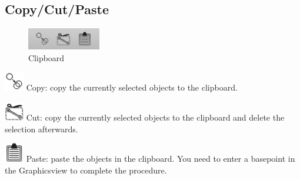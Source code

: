 \documentclass[a4paper,11pt]{report}
\begin{document}
\subsection{Copy/Cut/Paste}
\begin{minipage}[h]{4cm}
\begin{figure}[H]
\begin{center}
\includegraphics[scale=0.6]{../pictures/clipboardtoolbar.png}
\caption{Clipboard}
\label{pic:clipboardtoolbar}
\end{center}
\end{figure}
\end{minipage}
\begin{minipage}[h]{\textwidth-4cm}
\begin{trivlist}
	\item[] \includegraphics[scale = 0.5]{../../icons/copy.png} Copy: copy the currently selected objects to the clipboard.
	\item[] \includegraphics[scale = 0.5]{../../icons/cut.png} Cut: copy the currently selected objects to the clipboard and delete the selection afterwards.
	\item[] \includegraphics[scale = 0.5]{../../icons/paste.png} Paste: paste the objects in the clipboard. You need to enter a basepoint in the Graphicsview to complete the procedure. 
\end{trivlist}
\end{minipage}
\end{document}
